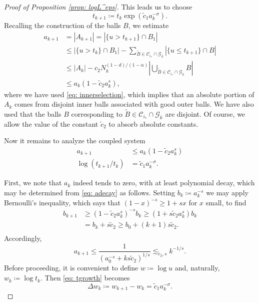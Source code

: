 \documentclass[reqno]{amsart}
\numberwithin{equation}{section}
\numberwithin{equation}{section}
\begin{document}
\begin{proof}[Proof of Proposition \ref{prop: logL^eps}]
This leads us to choose
$$
t_{k+1} \coloneqq t_k \exp(\tilde{c}_1 a_k^{-\sigma}).
$$
Recalling the construction of the balls $B$, we estimate
\begin{align}
a_{k+1}
&= |A_{k+1}| = |\{u> t_{k+1}\}\cap B_1| \\
&\le |\{u>t_k\} \cap B_1|
-
\sum_{\widetilde B \in \mathcal{C}_{i_*}\cap \mathcal{G}_k}
|\{u \le t_{k+1} \} \cap B| \\
&\le |A_k|
-
c_2N_k^{(1-d)/(1-\alpha)}
\left|\bigcup_{\widetilde B \in \mathcal{C}_{i_*}\cap \mathcal{G}_k} B\right| \\
&\le a_k(1-\tilde{c}_2a_k^s),
\end{align}
where we have used \eqref{eq: innerselection}, which implies that an absolute portion of $A_k$ comes from disjoint inner balls associated with good outer balls. We have also used that the balls $B$ corresponding to $\tilde{B} \in \mathcal{C}_{i_*} \cap \mathcal{G}_k$ are disjoint. Of course, we allow the value of the constant $\tilde{c}_2$ to absorb absolute constants.

Now it remains to analyze the coupled system
\begin{align}
\label{eq: adecay}
a_{k+1} &\le a_k(1-\tilde{c}_2a_k^s)\\
\label{eq: tgrowth}
\log(t_{k+1}/t_k) &= \tilde{c}_1a_k^{-\sigma}.
\end{align}

First, we note that $a_k$ indeed tends to zero, with at least polynomial decay, which may be determined from \eqref{eq: adecay} as follows. Setting $b_k \coloneqq a_k^{-s}$ we may apply Bernoulli's inequality, which says that $(1-x)^{-s} \ge 1+sx$ for $x$ small, to find
    \begin{align}b_{k+1} &\ge (1-\tilde{c}_2a_k^s)^{-s}b_k \ge (1+s\tilde{c}_2a_k^s)b_k \\
    &= b_k + s\tilde{c}_2 \ge b_0 + (k+1)s\tilde{c}_2.\\
    \end{align}
Accordingly, 
 \begin{equation}
 \label{eq: adecay2} a_{k+1} \le \frac{1}{(a_0^{-s} + ks\tilde{c}_2)^{1/s}} \lesssim_{\tilde{c}_2,s} k^{-1/s}.
 \end{equation}
Before proceeding, it is convenient to define $w \coloneqq \log u$ and, naturally, $w_k \coloneqq \log t_k$. Then \eqref{eq: tgrowth} becomes
\begin{equation}
\label{eq: tgrowth2}
\Delta w_k \coloneqq w_{k+1} - w_k = \tilde{c}_1a_k^{-\sigma}.
\end{equation}


\end{proof}
\end{document}
